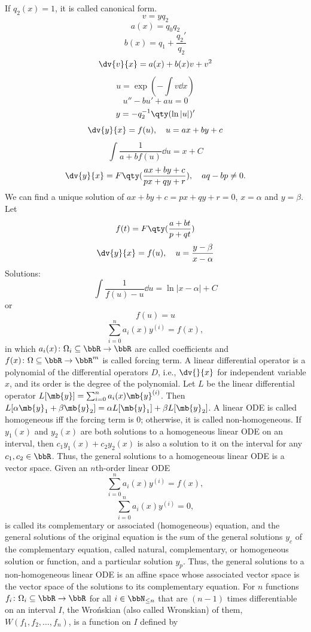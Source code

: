 \documentclass[a4paper,12pt]{article}
\begin{document}
If $q_2(x)=1$, it is called canonical form.
\[v=yq_2\]
\[a(x)=q_0q_2\]
\[b(x)=q_1+\frac{q_2'}{q_2}\]
\[\dv{v}{x}=a(x)+b(x)v+v^2\]
\[u=\exp(-\int v\dd{x})\]
\[u''-bu'+au=0\]
\[y=-q_2^{-1}\qty(\ln|u|)'\]
\[\dv{y}{x}=f(u),\quad u=ax+by+c\]
\[\int\frac{1}{a+bf(u)}\dd{u}=x+C\]
\[\dv{y}{x}=F\qty(\frac{ax+by+c}{px+qy+r}),\quad aq-bp\neq 0.\]
We can find a unique solution of $ax+by+c=px+qy+r=0$, $x=\alpha$ and $y=\beta$. Let
\[f(t)=F\qty(\frac{a+bt}{p+qt})\]
\[\dv{y}{x}=f(u),\quad u=\frac{y-\beta}{x-\alpha}\]
Solutions:
\[\int\frac{1}{f(u)-u}\dd{u}=\ln|x-\alpha|+C\]
or
\[f(u)=u\]
\[\sum_{i=0}^na_i(x)y^{(i)}=f(x),\]
in which $a_i(x)\colon\Omega_i\subseteq\bbR\to\bbR$ are called coefficients and $f(x)\colon\Omega\subseteq\bbR\to\bbR^m$ is called forcing term.
A linear differential operator is a polynomial of the differential operators $D$, i.e., $\dv{}{x}$ for independent variable $x$, and its order is the degree of the polynomial.
Let $L$ be the linear differential operator $L[\mb{y}]=\sum_{i=0}^na_i(x)\mb{y}^{(i)}$. Then $L[\alpha\mb{y}_1+\beta\mb{y}_2]=\alpha L[\mb{y}_1]+\beta L[\mb{y}_2]$.
A linear ODE is called homogeneous iff the forcing term is 0; otherwise, it is called non-homogeneous.
If $y_1(x)$ and $y_2(x)$ are both solutions to a homogeneous linear ODE on an interval, then $c_1y_1(x)+c_2y_2(x)$ is also a solution to it on the interval for any $c_1,c_2\in\bbR$. Thus, the general solutions to a homogeneous linear ODE is a vector space.
Given an $n$th-order linear ODE
\[\sum_{i=0}^na_i(x)y^{(i)}=f(x),\]
\[\sum_{i=0}^na_i(x)y^{(i)}=0,\]
is called its complementary or associated (homogeneous) equation, and the general solutions of the original equation is the sum of the general solutions $y_c$ of the complementary equation, called natural, complementary, or homogeneous solution or function, and a particular solution $y_p$. Thus, the general solutions to a non-homogeneous linear ODE is an affine space whose associated vector space is the vector space of the solutions to its complementary equation.
For $n$ functions $f_i\colon\Omega_i\subseteq\bbR\to\bbR$ for all $i\in\bbN_{\le n}$ that are $(n-1)$ times differentiable on an interval $I$, the Wrońskian (also called Wronskian) of them, $W(f_1,f_2,\ldots,f_n)$, is a function on $I$ defined by
\end{document}
